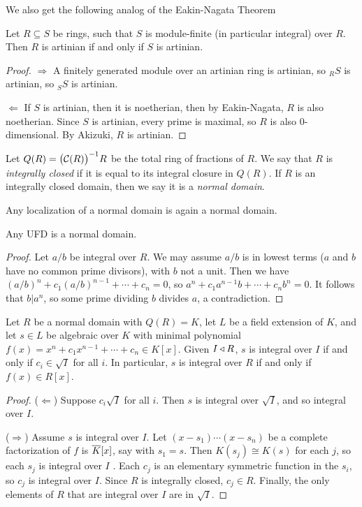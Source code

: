  We also get the following analog of the Eakin-Nagata Theorem
 \begin{corollary}
   Let $R\subseteq S$ be rings, such that $S$ is module-finite (in particular integral)
   over $R$. Then $R$ is artinian if and only if $S$ is artinian.
 \end{corollary}
 \begin{proof}
   $\Rightarrow$ A finitely generated module over an artinian ring is artinian, so ${}_R
   S$ is artinian, so ${}_S S$ is artinian.

   $\Leftarrow$ If $S$ is artinian, then it is noetherian, then by Eakin-Nagata, $R$ is
   also noetherian. Since $S$ is artinian, every prime is maximal, so $R$ is also
   0-dimensional. By Akizuki, $R$ is artinian.
 \end{proof}

 \begin{definition}
   Let $Q(R) = \bigl(\mathcal{C}(R)\bigr)^{-1} R$ be the total ring of fractions of $R$. We say
   that $R$ is \emph{integrally closed} if it is equal to its integral closure in $Q(R)$.
   If $R$ is an integrally closed domain, then we say it is a \emph{normal domain}.
 \end{definition}
 \begin{remark}
   Any localization of a normal domain is again a normal domain.
 \end{remark}
 \begin{proposition}
   Any UFD is a normal domain.
 \end{proposition}
 \begin{proof}
   Let $a/b$ be integral over $R$. We may assume $a/b$ is in lowest terms ($a$ and $b$
   have no common prime divisors), with $b$ not a unit. Then we have
   $(a/b)^n+c_1(a/b)^{n-1}+\cdots+ c_n=0$, so $a^n+c_1 a^{n-1}b+\cdots + c_nb^n=0$. It
   follows that $b|a^n$, so some prime dividing $b$ divides $a$, a contradiction.
 \end{proof}
 \begin{lemma}
   Let $R$ be a normal domain with $Q(R)=K$, let $L$ be a field extension of $K$, and let
   $s\in L$ be algebraic over $K$ with minimal polynomial $f(x)=x^n+c_1x^{n-1}+\cdots
   + c_n\in K[x]$. Given $I\triangleleft R$, $s$ is integral over $I$ if and only if $c_i\in \sqrt
   I$ for all $i$. In particular, $s$ is integral over $R$ if and only if $f(x)\in R[x]$.
 \end{lemma}
 \begin{proof}
   ($\Leftarrow$) Suppose $c_i \sqrt I$ for all $i$. Then $s$ is integral over $\sqrt I$,
   and so integral over $I$.

   ($\Rightarrow$) Assume $s$ is integral over $I$. Let $(x-s_1)\cdots (x-s_n)$ be a
   complete factorization of $f$ is $\overline{K}[x]$, say with $s_1=s$. Then $K(s_j)\cong
   K(s)$ for each $j$, so each $s_j$ is integral over $I$ . Each $c_j$ is an elementary symmetric
   function in the $s_i$, so $c_j$ is integral over $I$. Since $R$ is integrally closed,
   $c_j\in R$. Finally, the only elements of $R$ that are integral over $I$ are in $\sqrt
   I$.
 \end{proof}
